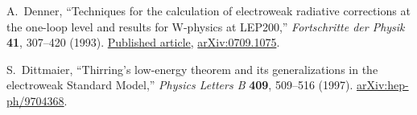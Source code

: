 A.~Denner,
``Techniques for the calculation of electroweak radiative corrections at the
one-loop level and results for W-physics at LEP200,''
\textit{Fortschritte der Physik} \textbf{41}, 307--420 (1993).
\href{https://doi.org/10.1002/prop.2190410402}{Published article},
\href{https://arxiv.org/abs/0709.1075}{arXiv:0709.1075}.

S.~Dittmaier,
``Thirring's low-energy theorem and its generalizations in the electroweak
Standard Model,''
\textit{Physics Letters B} \textbf{409}, 509--516 (1997).
\href{https://arxiv.org/abs/hep-ph/9704368}{arXiv:hep-ph/9704368}.
